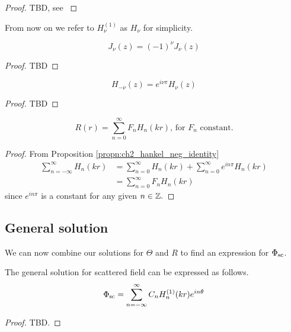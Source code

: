   \begin{proof}
      TBD, see \cite[$\S$4.2]{martin06scattering}
  \end{proof}\par
%
From now on we refer to $H^{(1)}_\nu$ as $H_\nu$ for simplicity.
  \begin{propn}
    \[
    J_\nu(z) = (-1)^\nu J_\nu(z)
    \]
  \end{propn}
  \begin{proof}
    TBD
  \end{proof}
%
  \begin{propn}\label{propn:ch2_hankel_neg_identity}
    \[
    H_{-\nu}(z) = e^{i\nu \pi}H_\nu(z)
    \]
  \end{propn}
  \begin{proof}
    TBD
  \end{proof}
%
  \begin{propn}
    \begin{equation*}
      R(r) = \sum^\infty_{n=0} F_n H_n(kr) \text{, for $F_n$ constant.}
    \end{equation*}
  \end{propn}
  \begin{proof}
    From Proposition \ref{propn:ch2_hankel_neg_identity}
      \begin{align*}
        \sum^\infty_{n=-\infty} H_n(kr)
        & = \sum^\infty_{n=0} H_n(kr) + \sum^\infty_{n=0} e^{in\pi} H_n(kr)\\
        & = \sum^\infty_{n=0} F_n H_n(kr)
      \end{align*}
    since $e^{in\pi}$ is a constant for any given $n \in \mathbb{Z}.$
  \end{proof}
\subsection{General solution}
We can now combine our solutions for $\Theta$ and $R$ to find an expression for $\Phi_{\text{sc}}$.
%
    \begin{propn} The general solution for scattered field can be expressed as follows.
        \begin{equation*}
            \Phi_{\text{sc}} = \sum^\infty_{n=-\infty} C_n H_n^{(1)}(kr)e^{in\theta}
        \end{equation*}
    \end{propn}
    \begin{proof} TBD.
    \end{proof}
